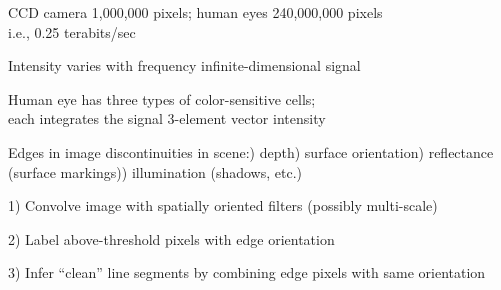 \documentclass{article}
\begin{document}
\begin{huge}
CCD camera \mat{$\approx$} 1,000,000 pixels; human eyes \mat{$\approx$} 240,000,000 pixels\\
i.e., 0.25 terabits/sec


Intensity varies with frequency \mat{$\rightarrow$} infinite-dimensional signal

\vspace*{0.2in}

\textwidth
{}

Human eye has three types of color-sensitive cells;\\
each integrates the signal \mat{$\implies$} 3-element vector intensity




\vspace*{0.2in}

\textwidth
{}

\vspace*{-1in}

Edges in image \mat{$\Leftarrow$} discontinuities in scene:) depth) surface orientation) reflectance (surface markings)) illumination (shadows, etc.)



1) Convolve image with spatially oriented filters (possibly multi-scale)
\mat{\[
  E_{\theta}(x,y) = \int_{-\infty}^{\infty} \int_{-\infty}^{\infty} f_{\theta}(u,v) I(x+u,y+v)\,du\,dv
\]}%

\vspace*{-0.3in}

\textwidth
{}

\vspace*{-0.3in}

2) Label above-threshold pixels with edge orientation

3) Infer ``clean'' line segments by combining edge pixels with same orientation

\vspace*{0.2in}

\textwidth
{}


\end{huge}
\end{document}
